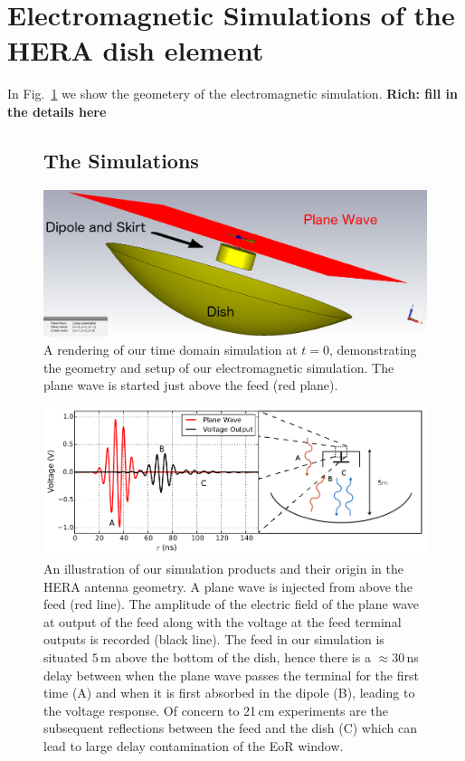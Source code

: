 \documentclass[onecolumn]{emulateapj}
\begin{document}
\section{Electromagnetic Simulations of the HERA dish element}\label{sec:Simulations}
In Fig.~\ref{fig:SimulationSetup} we show the geometery of the electromagnetic simulation. {\bf Rich: fill in the details here}
\begin{figure}


\subsection{The Simulations}
\includegraphics[width=.5\textwidth]{figures/One_dish_Pfeed_render_pw_0deg.png}
\caption{A rendering of our time domain simulation at $t=0$, demonstrating the geometry and setup of our electromagnetic simulation. The plane wave is started just above the feed (red plane).}\label{fig:SimulationSetup}
\end{figure}

\begin{figure}
\includegraphics[width=\textwidth]{figures/SimulationIllustration.png}
\caption{An illustration of our simulation products and their origin in the HERA antenna geometry. A plane wave is injected from above the feed (red line). The amplitude of the electric field of the plane wave at output of the feed along with the voltage at the feed terminal outputs is recorded (black line). The feed in our simulation is situated $5$\,m above the bottom of the dish, hence there is a $\approx 30$\,ns delay between when the plane wave passes the terminal for the first time (A) and when it is first absorbed in the dipole (B), leading to the voltage response. Of concern to 21\,cm experiments are the subsequent reflections between the feed and the dish (C) which can lead to large delay contamination of the EoR window.}
\label{fig:Simulation}
\end{figure}
\end{document}
